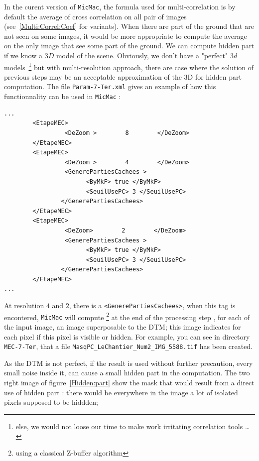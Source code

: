 In the curent version of {\tt MicMac},  the formula used for multi-correlation is
by default  the average of cross correlation on all pair of images (see~\ref{Multi:Correl:Coef}
for variants).  When there are  part of the ground that are not seen on some images,
it would be more appropriate to compute the average on the only image that see some
part of the ground. We can compute hidden part if we know a $3D$ model of the scene.
Obviously, we don't have a "perfect" $3d$ models~\footnote{else, we would not loose our
time to make work irritating correlation tools \dots } but with multi-resolution
approach, there are case where the solution of previous steps may be an acceptable
approximation of the 3D for hidden part computation.
The file {\tt Param-7-Ter.xml} gives an example of how this functionnality
can be used in {\tt MicMac}  :


{\scriptsize
\begin{verbatim}
...
        <EtapeMEC>
                 <DeZoom >        8        </DeZoom>
        </EtapeMEC>
        <EtapeMEC>
                 <DeZoom >        4        </DeZoom>
                 <GenerePartiesCachees >
                       <ByMkF> true </ByMkF>
                       <SeuilUsePC> 3 </SeuilUsePC>
                </GenerePartiesCachees>
        </EtapeMEC>
        <EtapeMEC>
                 <DeZoom>        2        </DeZoom>
                 <GenerePartiesCachees >
                       <ByMkF> true </ByMkF>
                       <SeuilUsePC> 3 </SeuilUsePC>
                </GenerePartiesCachees>
        </EtapeMEC>
...     
\end{verbatim}
}


At resolution $4$ and $2$, there is a {\tt <GenerePartiesCachees>}, when this tag
is encontered, {\tt MicMac} will compute \footnote{using a classical Z-buffer algorithm}
at the end of the processing
step , for each of the input image, an image
superposable to the DTM; this image indicates for each pixel if this pixel is visible
or hidden. For example, you can see in directory {\tt MEC-7-Ter}, that 
a file {\tt  MasqPC\_LeChantier\_Num2\_IMG\_5588.tif} has been created.

As the DTM is not perfect,  if the result is used without further precaution, 
every small noise inside it, can cause a small hidden part in the computation.
The two right image of figure~\ref{Hidden:part} show the mask that would
result from a direct use of hidden part : there would be everywhere in
the image a lot of isolated pixels supposed to be hiddden; 


